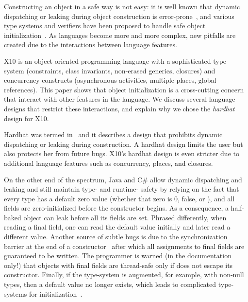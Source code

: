 Constructing an object in a safe way is not easy:
    it is well known that dynamic dispatching
    or leaking \this during object construction
    is error-prone~\cite{Dean:1996,Seo:2007:SBD:1522565.1522587,Gil:2009:WRS:1615184.1615216},
    and various type systems and verifiers have been proposed to
    handle safe object initialization~\cite{Hubert:2010:ESO:1888881.1888890,Zibin:2010:OIG:1869459.1869509,Fahndrich:2007:EOI:1297027.1297052,XinQi:2009}.
As languages become more and more complex,
    new pitfalls are created due to the interactions between
    language features.

X10 is an object oriented programming language with a sophisticated
    type system (constraints, class invariants, non-erased generics, closures)
    and concurrency constructs (asynchronous activities, multiple places, global references).
This paper shows that object initialization is a cross-cutting concern
    that interact with other features in the language.
We discuss several language designs that restrict these interactions,
    and explain why we chose the \emph{hardhat} design for X10.

{Hardhat} was termed in~\cite{Gil:2009:WRS:1615184.1615216}
    and it describes a design that prohibits dynamic dispatching or leaking \this during construction.
A hardhat design limits the user
    but also protects her from future bugs.
X10's hardhat design is even stricter due to additional language features
    such as concurrency, places, and closures.

On the other end of the spectrum,
    Java and C\# allow
    dynamic dispatching and leaking \this
    and still maintain type- and runtime- safety
    by relying on the fact that every type has a default zero value
    (whether that zero is 0, false, or ),
    and all fields are zero-initialized before the constructor begins.
As a consequence,
    a half-baked object can leak before all its fields are set. %
Phrased differently,
    when reading a final field, one can read the default value initially and later read a different value.
Another source of subtle bugs is due to the synchronization barrier
    at the end of a constructor~\cite{JSR133}
    after which all assignments to final fields are guaranteed to be written.
The programmer is warned (in the documentation only!)
    that objects with final fields are thread-safe only if
    \this does not escape its constructor.
Finally, if the type-system is augmented, for example, with non-null types, then
    a default value no longer exists,
    which leads to complicated type-systems for initialization~\cite{Fahndrich:2007:EOI:1297027.1297052,XinQi:2009}.

